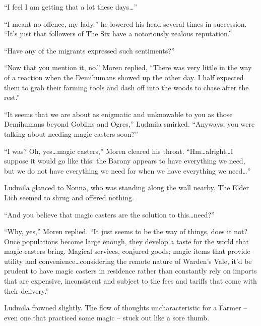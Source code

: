  

“I feel I am getting that a lot these days…”

 

“I meant no offence, my lady,” he lowered his head several times in succession. “It’s just that followers of The Six have a notoriously zealous reputation.”

 

“Have any of the migrants expressed such sentiments?”

 

“Now that you mention it, no.” Moren replied, “There was very little in the way of a reaction when the Demihumans showed up the other day. I half expected them to grab their farming tools and dash off into the woods to chase after the rest.”

 

“It seems that we are about as enigmatic and unknowable to you as those Demihumans beyond Goblins and Ogres,” Ludmila smirked. “Anyways, you were talking about needing magic casters soon?”

 

“I was? Oh, yes…magic casters,” Moren cleared his throat. “Hm…alright…I suppose it would go like this: the Barony appears to have everything we need, but we do not have everything we need for when we have everything we need…”

 

Ludmila glanced to Nonna, who was standing along the wall nearby. The Elder Lich seemed to shrug and offered nothing.

 

“And you believe that magic casters are the solution to this…need?”

 

“Why, yes,” Moren replied. “It just seems to be the way of things, does it not? Once populations become large enough, they develop a taste for the world that magic casters bring. Magical services, conjured goods; magic items that provide utility and convenience…considering the remote nature of Warden’s Vale, it’d be prudent to have magic casters in residence rather than constantly rely on imports that are expensive, inconsistent and subject to the fees and tariffs that come with their delivery.”

 

Ludmila frowned slightly. The flow of thoughts uncharacteristic for a Farmer – even one that practiced some magic – stuck out like a sore thumb.

 

